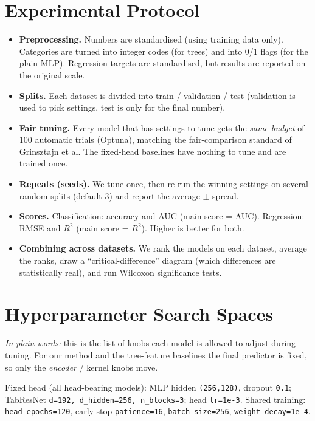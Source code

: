 \documentclass[11pt]{article}
\newcommand{\code}[1]{\texttt{#1}}
\begin{document}
\section{Experimental Protocol}
\begin{itemize}[leftmargin=1.4em,itemsep=2pt]
  \item \textbf{Preprocessing.} Numbers are standardised (using training data
  only). Categories are turned into integer codes (for trees) and into 0/1 flags
  (for the plain MLP). Regression targets are standardised, but results are
  reported on the original scale.
  \item \textbf{Splits.} Each dataset is divided into train / validation / test
  (validation is used to pick settings, test is only for the final number).
  \item \textbf{Fair tuning.} Every model that has settings to tune gets the
  \emph{same budget} of 100 automatic trials (Optuna), matching the fair-comparison
  standard of Grinsztajn et al. The fixed-head baselines have nothing to tune and
  are trained once.
  \item \textbf{Repeats (seeds).} We tune once, then re-run the winning settings on
  several random splits (default 3) and report the average $\pm$ spread.
  \item \textbf{Scores.} Classification: accuracy and AUC (main score = AUC).
  Regression: RMSE and $R^2$ (main score = $R^2$). Higher is better for both.
  \item \textbf{Combining across datasets.} We rank the models on each dataset,
  average the ranks, draw a ``critical-difference'' diagram (which differences are
  statistically real), and run Wilcoxon significance tests.
\end{itemize}

\section{Hyperparameter Search Spaces}
\emph{In plain words:} this is the list of knobs each model is allowed to adjust
during tuning. For our method and the tree-feature baselines the final predictor
is fixed, so only the \emph{encoder} / kernel knobs move.

\noindent Fixed head (all head-bearing models): MLP hidden \code{(256,128)},
dropout \code{0.1}; TabResNet \code{d=192, d\_hidden=256, n\_blocks=3}; head
\code{lr=1e-3}. Shared training: \code{head\_epochs=120}, early-stop
\code{patience=16}, \code{batch\_size=256}, \code{weight\_decay=1e-4}.
\end{document}
